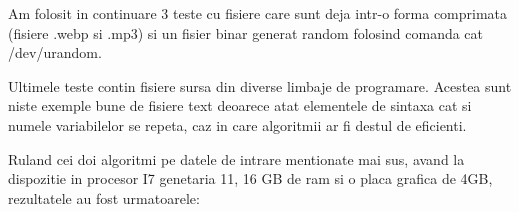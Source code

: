 \documentclass[runningheads]{llncs}
\begin{document}
Am folosit in continuare 3 teste cu fisiere care sunt deja intr-o forma comprimata (fisiere .webp si .mp3) si un fisier binar generat random folosind comanda cat /dev/urandom.

Ultimele teste contin fisiere sursa din diverse limbaje de programare. Acestea sunt niste exemple bune de fisiere text deoarece atat elementele de sintaxa cat si
numele variabilelor se repeta, caz in care algoritmii ar fi destul de eficienti.

Ruland cei doi algoritmi pe datele de intrare mentionate mai sus, avand la dispozitie in procesor I7 genetaria 11, 16 GB de ram si o placa grafica de 4GB, rezultatele au fost urmatoarele:

\end{document}
